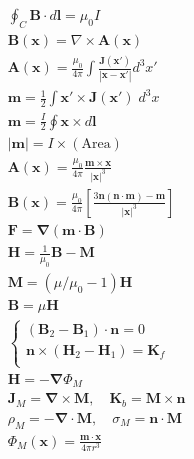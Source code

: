 \documentclass[10pt]{article}
\newcommand{\ve}[1]{\boldsymbol{\mathbf{#1}}}
\newcommand{\vect}[1]{\boldsymbol{\mathbf{#1}}}
\begin{document}
\begin{multicols}{2}
\begin{align*}
		& \oint_C \vect{B} \cdot d \vect{l} = \mu_0 I \tag*{Amp\`ere's law (5.25)}\\
		& \vect{B}(\vect{x}) = \nabla \times \vect{A}(\vect{x}) \tag*{Magnetic vector potential (5.27)} \\
		& \vect{A}(\vect{x}) = \frac{\mu_0}{4 \pi} \int \frac{\vect{J}(\vect{x}')}{|\vect{x}-\vect{x}'|} d^3 x' \tag*{Magnetic vector potential of current distribution (5.32)} \\
		& \vect{m} = \frac{1}{2} \int \vect{x}' \times \vect{J}(\vect{x}') \; d^3 x \tag*{Magnetic moment definition (5.54)} \\
		& \vect{m} = \frac{I}{2} \oint \vect{x} \times d \vect{l} \tag*{Magnetic moment of closed circuit (J. pg. 186)} \\
		& |\vect{m}| = I \times (\text{Area}) \tag*{Magnetic moment of plane loop (5.57)} \\
		& \vect{A}(\vect{x}) = \frac{\mu_0}{4 \pi} \frac{\vect{m} \times \vect{x}}{|\vect{x}|^3} \tag*{Dipole vector potential (5.55)} \\
		& \vect{B}(\vect{x}) = \frac{\mu_0}{4 \pi} \left[ \frac{3 \vect{n}(\vect{n} \cdot \vect{m}) - \vect{m}}{|\vect{x}|^3} \right]\tag*{Dipole induction (5.56)}\\
		& \vect{F} = \vect{\nabla(m \cdot B)} \tag*{Force on dipole (5.69)} \\
		& \vect{H} = \frac{1}{\mu_0} \vect{B - M} \tag*{Magnetic field (5.81)} \\
		& \ve{M} = (\mu / \mu_0 - 1) \ve{H} \tag*{Magnetization in linear media (G. 6.29)} \\
		& \vect{B} = \mu \vect{H} \tag*{Linear condition (5.84)} \\
		&\begin{cases}
			(\vect{B}_2 - \vect{B}_1) \cdot \vect{n} = 0 \\
			\vect{n} \times (\vect{H}_2 - \vect{H}_1) = \vect{K}_f \\ 
		\end{cases} \tag*{Interface BC (5.86)} \\
		& \vect{H} = -\vect{\nabla} \Phi_M \tag*{Magnetic scalar potential (5.93)} \\
		& \vect{J}_M = \vect{\nabla \times M}, \quad \vect{K}_b = \vect{M \times n}  \tag*{Bound current density (G. 6.13,14)} \\
		& \rho_M = - \vect{\nabla \cdot M}, \quad \sigma_M = \vect{n \cdot M} \tag*{Effective magnetic charge density (5.96,99)} \\
		& \Phi_M(\vect{x}) = \frac{\vect{m \cdot x}}{4 \pi r^3} \tag*{Magnetic scalar potential of dipole (J. pg. 196)} \\

\end{align*}
\end{multicols}
\end{document}
